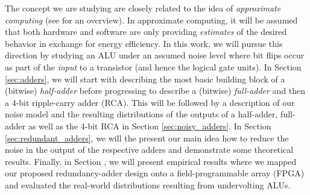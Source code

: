 The concept we are studying are closely related to the idea of {\em approximate computing} (see \cite{XuMytKim2022a} for an overview). In approximate computing, it will be assumed that both hardware and software are only providing {\em estimates} of the desired behavior in exchange for energy efficiency. In this work, we will pursue this direction by  studying an ALU under an assumed noise level where bit flips occur as part of the {\em input} to a transistor (and hence the logical gate units). In Section \ref{sec:adders}, we will start with describing the most basic building block of a (bitwise) {\em half-adder} before progressing to describe a (bitwise) {\em full-adder} and then a 4-bit ripple-carry adder (RCA). This will be followed by a description of our noise model and the resulting distributions of the outputs of a half-adder, full-adder as well as the 4-bit RCA in Section \ref{sec:noisy_adders}. In Section \ref{sec:redundant_adders}, we will the present our main idea how to reduce the noise in the output of the respective adders and demonstrate some theoretical results. Finally, in Section , we will present empirical results where we mapped our proposed redundancy-adder design onto a field-programmable array (FPGA) and evaluated the real-world distributions resulting from undervolting ALUs.
